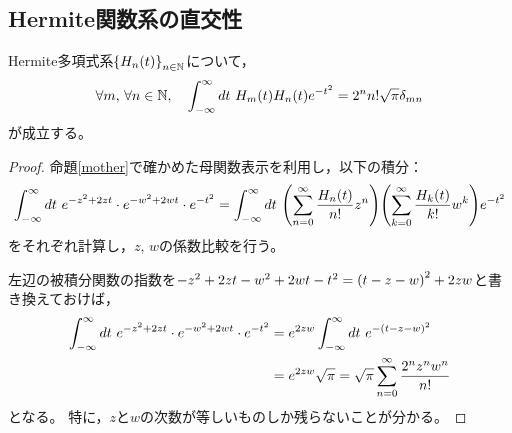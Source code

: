 \documentclass[a4paper,draft]{ltjsarticle}
\begin{document}
\subsection{Hermite関数系の直交性}
\begin{prop}\label{命題：直交性}
    Hermite多項式系$\seq{\fun{H_n}{t}}{n\in\N}$について，
    \begin{equation}
        \label{直交性}
        \forall m,\, \forall n\in \N,\quad
        \int_{-\infty}^\infty dt\ \fun{H_m}{t}\fun{H_n}{t}e^{-t^2}=2^n n! \sqrt{\pi} \delta_{mn}
    \end{equation}
    が成立する。

    \begin{proof}
        命題\ref{mother}で確かめた母関数表示を利用し，以下の積分：
        \begin{equation}
            \int_{-\infty}^\infty dt\ e^{-z^2+2zt}\cdot e^{-w^2+2wt}\cdot e^{-t^2}
            = \int_{-\infty}^\infty dt\ \pare{\sum_{n=0}^\infty \dfrac{\fun{H_n}{t}}{n!}z^n}\pare{\sum_{k=0}^\infty \dfrac{\fun{H_k}{t}}{k!}w^k} e^{-t^2}
        \end{equation}
        をそれぞれ計算し，$z$, $w$の係数比較を行う。

        左辺の被積分関数の指数を$-z^2+2zt-w^2+2wt-t^2=\pare{t-z-w}^2+2zw$と書き換えておけば，
        \begin{align}
            \int_{-\infty}^\infty dt\ e^{-z^2+2zt}\cdot e^{-w^2+2wt}\cdot e^{-t^2}
            &= e^{2zw}\int_{-\infty}^\infty dt\ e^{-\pare{t-z-w}^2} 
            \\
            &=e^{2zw}\sqrt{\pi}=\sqrt{\pi}\sum_{n=0}^\infty \dfrac{2^nz^nw^n}{n!}
        \end{align}
        となる。
        特に，$z$と$w$の次数が等しいものしか残らないことが分かる。


\end{proof}
\end{prop}
\end{document}
